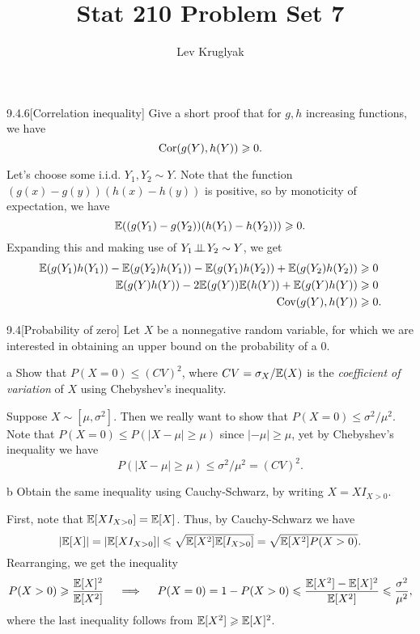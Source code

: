 \documentclass{pset}
\title{Stat 210 Problem Set 7}
\author{Lev Kruglyak}
\begin{document}
\maketitle
\collaborators

\begin{problem}{9.4.6}[Correlation inequality]
  Give a short proof that for $g,h$ increasing functions, we have
  \[ \textrm{Cor}(g(Y), h(Y)) \geqslant 0.\] %
\end{problem}

\begin{solution}
  Let's choose some i.i.d. $Y_1, Y_2\sim Y$. Note that the function $(g(x)-g(y))(h(x)-h(y))$ is positive, so by monoticity of expectation, we have
  \[
    \mathbb{E}((g(Y_1) - g(Y_2))(h(Y_1) - h(Y_2))) \geqslant 0.
  \]
  Expanding this and making use of $Y_1\!\perp\!\!\!\perp\! Y_2 \sim Y$, we get
  \[
    \begin{aligned}
      \mathbb{E}(g(Y_1)h(Y_1)) - \mathbb{E}(g(Y_2)h(Y_1)) - \mathbb{E}(g(Y_1)h(Y_2)) + \mathbb{E}(g(Y_2) h(Y_2)) &\geqslant 0\\
      \mathbb{E}(g(Y)h(Y)) - 2\mathbb{E}(g(Y))\mathbb{E}(h(Y)) + \mathbb{E}(g(Y)h(Y)) &\geqslant 0\\
      \textrm{Cov}(g(Y), h(Y)) &\geqslant 0.
    \end{aligned}
  \]
\end{solution}

\begin{problem}{9.4}[Probability of zero]
  Let $X$ be a nonnegative random variable, for which we are interested in obtaining an upper bound on the probability of a $0$.
\end{problem}

\begin{parts}
  \begin{part}{a}
    Show that $P(X=0) \leq (CV)^2$, where $CV = \sigma_X / \mathbb{E}(X)$ is the \emph{coefficient of variation} of $X$ using Chebyshev's inequality.
  \end{part}

  Suppose $X\sim [\mu, \sigma^2]$. Then we really want to show that $P(X=0)\leq \sigma^2/\mu^2$. Note that $P(X=0) \leq P(|X-\mu| \geq \mu)$ since $|-\mu|\geq \mu$, yet by Chebyshev's inequality we have
  \[
    P(|X-\mu| \geq \mu) \leq \sigma^2/\mu^2 = (CV)^2.
  \]

  \begin{part}{b}
    Obtain the same inequality using Cauchy-Schwarz, by writing $X = XI_{X >0}$.
  \end{part}

  First, note that $\mathbb{E}[XI_{X>0}]=\mathbb{E}[X]$. Thus, by Cauchy-Schwarz we have
  \[
    |\mathbb{E}[X]|=|\mathbb{E}[XI_{X>0}]| \leqslant \sqrt{\mathbb{E}[X^2]\mathbb{E}[I_{X>0}]} = \sqrt{\mathbb{E}[X^2]P(X>0)}.
  \]
  Rearranging, we get the inequality
  \[
    P(X>0) \geqslant \frac{\mathbb{E}[X]^2}{\mathbb{E}[X^2]} \quad \implies \quad P(X=0)=1-P(X>0)\leqslant \frac{\mathbb{E}[X^2]-\mathbb{E}[X]^2}{\mathbb{E}[X^2]}\leqslant\frac{\sigma^2}{\mu^2},
  \]
  where the last inequality follows from $\mathbb{E}[X^2]\geqslant \mathbb{E}[X]^2$.
\end{parts}
\end{document}
